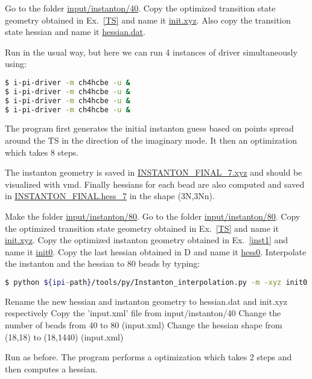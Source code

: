 \documentclass{article}
\begin{document}
\begin{Exercise}[label={inst1},title={First instanton optimization}]

\Question
Go to the folder \url{input/instanton/40}.
Copy the optimized transition state geometry obtained in Ex.~\ref{TS} and name it \url{init.xyz}.
Also copy the transition state hessian and name it \url{hessian.dat}.

Run \ipi{} in the usual way, but here we can run 4 instances of driver simultaneously using:
\begin{lstlisting}[language=bash]
$ i-pi-driver -m ch4hcbe -u &
$ i-pi-driver -m ch4hcbe -u &
$ i-pi-driver -m ch4hcbe -u &
$ i-pi-driver -m ch4hcbe -u &
\end{lstlisting}

The program first generates the initial instanton guess
based on points spread around the TS in the direction of the imaginary mode.
It then an optimization which takes 8 steps.

The instanton geometry is saved in \url{INSTANTON_FINAL_7.xyz} and should be visualized with vmd.
Finally hessians for each bead are also computed and saved in \url{INSTANTON_FINAL.hess_7}
in the shape (3N,3Nn).

\end{Exercise}

\begin{Exercise}[label={inst2},title={Second and subsequent instanton optimizations}]

\Question
Make the folder \url{input/instanton/80}.
\Question
Go to the folder \url{input/instanton/80}.
\Question
Copy the optimized transition state geometry obtained in Ex.~\ref{TS} and name it \url{init.xyz}.
\Question
Copy the optimized instanton geometry obtained in Ex.~\ref{inst1} and name it \url{init0}.
\Question
Copy the last hessian obtained in D and name it \url{hess0}.
\Question
Interpolate the instanton and the hessian to 80 beads by typing:
\begin{lstlisting}[language=bash]
$ python ${ipi-path}/tools/py/Instanton_interpolation.py -m -xyz init0 -hess hess0 -n 80
\end{lstlisting}
\Question
Rename the new hessian and instanton geometry to hessian.dat and init.xyz respectively
\Question
Copy the 'input.xml' file from input/instanton/40
\Question
Change the number of beads from 40 to 80 (input.xml)
\Question
Change the hessian shape from (18,18) to (18,1440) (input.xml)

Run as before.  The program performs a optimization which takes 2 steps and then computes a hessian.

\end{Exercise}
\end{document}
